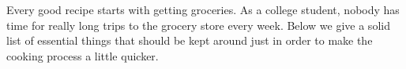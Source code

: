 \begin{center}
\textbf{}
\end{center}

Every good recipe starts with getting groceries. As a college student, nobody has time for really long trips to the grocery store every week. Below we give a solid list of essential things that should be kept around just in order to make the cooking process a little quicker. 